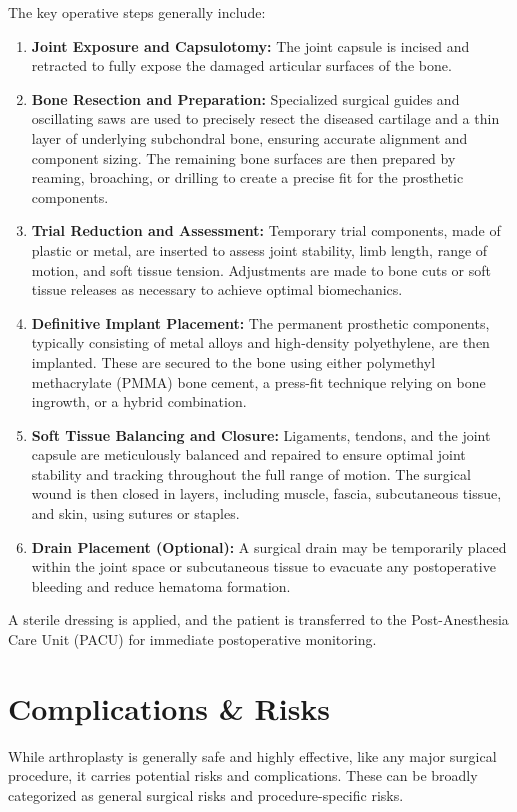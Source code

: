 The key operative steps generally include:
\begin{enumerate}
  \item \textbf{Joint Exposure and Capsulotomy:} The joint capsule is incised and retracted to fully expose the damaged articular surfaces of the bone.
  \item \textbf{Bone Resection and Preparation:} Specialized surgical guides and oscillating saws are used to precisely resect the diseased cartilage and a thin layer of underlying subchondral bone, ensuring accurate alignment and component sizing. The remaining bone surfaces are then prepared by reaming, broaching, or drilling to create a precise fit for the prosthetic components.
  \item \textbf{Trial Reduction and Assessment:} Temporary trial components, made of plastic or metal, are inserted to assess joint stability, limb length, range of motion, and soft tissue tension. Adjustments are made to bone cuts or soft tissue releases as necessary to achieve optimal biomechanics.
  \item \textbf{Definitive Implant Placement:} The permanent prosthetic components, typically consisting of metal alloys and high-density polyethylene, are then implanted. These are secured to the bone using either polymethyl methacrylate (PMMA) bone cement, a press-fit technique relying on bone ingrowth, or a hybrid combination.
  \item \textbf{Soft Tissue Balancing and Closure:} Ligaments, tendons, and the joint capsule are meticulously balanced and repaired to ensure optimal joint stability and tracking throughout the full range of motion. The surgical wound is then closed in layers, including muscle, fascia, subcutaneous tissue, and skin, using sutures or staples.
  \item \textbf{Drain Placement (Optional):} A surgical drain may be temporarily placed within the joint space or subcutaneous tissue to evacuate any postoperative bleeding and reduce hematoma formation.
\end{enumerate}
A sterile dressing is applied, and the patient is transferred to the Post-Anesthesia Care Unit (PACU) for immediate postoperative monitoring.

\section*{Complications \& Risks}
While arthroplasty is generally safe and highly effective, like any major surgical procedure, it carries potential risks and complications. These can be broadly categorized as general surgical risks and procedure-specific risks.

